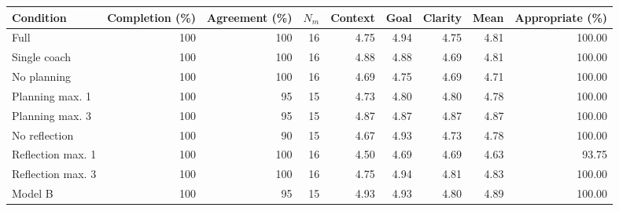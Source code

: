 \begin{tabular}{lrrrrrrrr}
\toprule
Condition & Completion (\%) & Agreement (\%) & $N_m$ & Context & Goal & Clarity & Mean & Appropriate (\%) \\
\midrule
Full & 100 & 100 & 16 & 4.75 & 4.94 & 4.75 & 4.81 & 100.00 \\
Single coach & 100 & 100 & 16 & 4.88 & 4.88 & 4.69 & 4.81 & 100.00 \\
No planning & 100 & 100 & 16 & 4.69 & 4.75 & 4.69 & 4.71 & 100.00 \\
Planning max. 1 & 100 & 95 & 15 & 4.73 & 4.80 & 4.80 & 4.78 & 100.00 \\
Planning max. 3 & 100 & 95 & 15 & 4.87 & 4.87 & 4.87 & 4.87 & 100.00 \\
No reflection & 100 & 90 & 15 & 4.67 & 4.93 & 4.73 & 4.78 & 100.00 \\
Reflection max. 1 & 100 & 100 & 16 & 4.50 & 4.69 & 4.69 & 4.63 & 93.75 \\
Reflection max. 3 & 100 & 100 & 16 & 4.75 & 4.94 & 4.81 & 4.83 & 100.00 \\
Model B & 100 & 95 & 15 & 4.93 & 4.93 & 4.80 & 4.89 & 100.00 \\
\bottomrule
\end{tabular}
